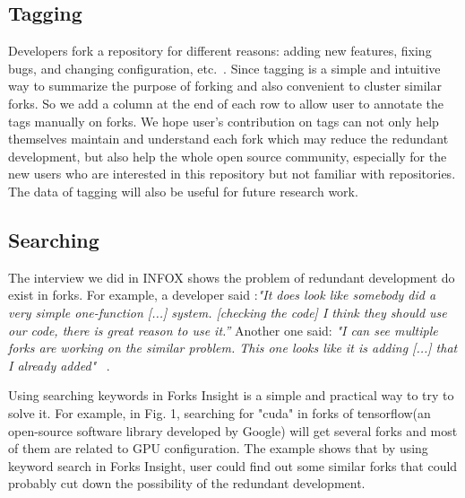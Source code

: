 \subsection{Tagging}
%
Developers fork a repository for different reasons: adding new features, fixing bugs, and changing configuration, etc.~\cite{Mikkonen2011,Robles2012,dubinsky2013exploratory,stanciulescu2015forked}.
%
Since tagging is a simple and intuitive way to summarize the purpose of forking and also convenient to cluster similar forks. So we add a column at the end of each row to allow user to annotate the tags manually on forks. We hope user's contribution on tags can not only help themselves maintain and understand each fork which may reduce the redundant development, but also help the whole open source community, especially for the new users who are interested in this repository but not familiar with repositories. The data of tagging will also be useful for future research work.


\subsection{Searching}

The interview we did in INFOX shows the problem of redundant development do exist in forks. For example, a developer said :\emph{"It does look like somebody did a very simple one-function [...] system. [checking the code] I think they should use our code, there is great reason to use it.''} Another one said: \emph{"I can see multiple forks are working on the similar problem. This one looks like it is adding [...] that I already added"} ~\cite{ZSLXWK:ICSE18}.

Using searching keywords in Forks Insight is a simple and practical way to try to solve it. For example, in Fig. 1, searching for "cuda" in forks of tensorflow(an open-source software library developed by Google) will get several forks and most of them are related to GPU configuration. The example shows that by using keyword search in Forks Insight, user could find out some similar forks that could probably cut down the possibility of the redundant development.

\iffalse
\begin{figure}[H]
\centering
\texttt{[image: shot2.png]}
\caption{An example of searching for similar forks.}
\vspace{-10pt}
\end{figure}
\fi

